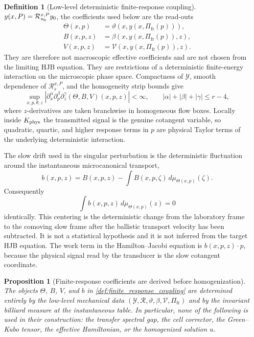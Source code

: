 \documentclass[12pt, letterpaper]{amsart}
\newcommand{\Pifr}{\Pi_{\mathrm{fr}}}
\theoremstyle{plain}
\newtheorem{proposition}[theorem]{Proposition}
\theoremstyle{definition}
\newtheorem{definition}[theorem]{Definition}
\theoremstyle{remark}
\begin{document}
\begin{definition}[Low-level deterministic finite-response coupling]
$y(x,P)=\mathcal R_{s_{\rm fr}}^{x,P}y_0$, the coefficients used below are the
read-outs
\begin{align}
    \Theta(x,p)&=\vartheta(x,y(x,\Pifr(p))),\nonumber\\
    B(x,p,z)&=\beta(x,y(x,\Pifr(p)),z),\label{eq:finite_response_readouts}\\
    V(x,p,z)&=\mathcal V(x,y(x,\Pifr(p)),z).\nonumber
\end{align}
They are therefore not macroscopic effective coefficients and are not chosen
from the limiting HJB equation.  They are restrictions of a deterministic
finite-energy interaction on the microscopic phase space.  Compactness of
$\mathcal Y$, smooth dependence of $\mathcal R_s^{x,P}$, and the homogeneity
strip bounds give
\begin{equation}
\label{eq:finite_response_global_bounds}
    \sup_{x,p,\theta,z}\left|
    \partial_x^\alpha\partial_p^\beta\partial_z^\gamma
    (\Theta,B,V)(x,p,z)\right|<\infty,
    \qquad |\alpha|+|\beta|+|\gamma|\le r-4,
\end{equation}
where $z$-derivatives are taken branchwise in homogeneous flow boxes.  Locally
inside $K_{\rm phys}$ the transmitted signal is the genuine cotangent variable,
so quadratic, quartic, and higher response terms in $p$ are physical Taylor
terms of the underlying deterministic interaction.

The slow drift used in the singular perturbation is the deterministic
fluctuation around the instantaneous microcanonical transport,
\begin{equation}
\label{eq:centered_drift_from_comoving_frame}
    b(x,p,z)=B(x,p,z)-\int B(x,p,\zeta)\,d\mu_{\Theta(x,p)}(\zeta).
\end{equation}
Consequently
\begin{equation}
    \int b(x,p,z)\,d\mu_{\Theta(x,p)}(z)=0
\end{equation}
identically.  This centering is the deterministic change from the laboratory
frame to the comoving slow frame after the ballistic transport velocity has
been subtracted.  It is not a statistical hypothesis and it is not inferred from
the target HJB equation.  The work term in the Hamilton--Jacobi equation is
$b(x,p,z)\cdot p$, because the physical signal read by the transducer is the
slow cotangent coordinate.
\end{definition}

\begin{proposition}[Finite-response coefficients are derived before homogenization]
\label{prop:finite_response_from_low_level}
The objects $\Theta$, $B$, $V$, and $b$ in
\cref{def:finite_response_coupling} are determined entirely by the low-level
mechanical data $(\mathcal Y,\mathcal R,\vartheta,\beta,\mathcal V,\Pifr)$ and
by the invariant billiard measure at the instantaneous table.  In particular,
none of the following is used in their construction: the transfer spectral gap,
the cell corrector, the Green--Kubo tensor, the effective Hamiltonian, or the
homogenized solution $u$.
\end{proposition}
\end{document}
